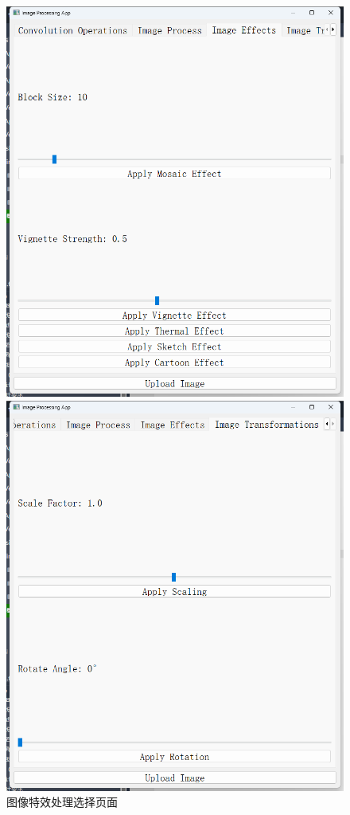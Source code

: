 \documentclass[a4paper,12pt]{article}
\begin{document}
\begin{figure}[htbp]
    \begin{minipage}[b]{0.48\textwidth}
        \centering
        \includegraphics[width=\linewidth]{images/Design/image_processing/GUI/3.png}
        \caption{图像特效处理选择页面}
    \end{minipage}
    \hfill
    \begin{minipage}[b]{0.48\textwidth}
        \centering
        \includegraphics[width=\linewidth]{images/Design/image_processing/GUI/4.png}

\end{minipage}
\end{figure}
\end{document}
